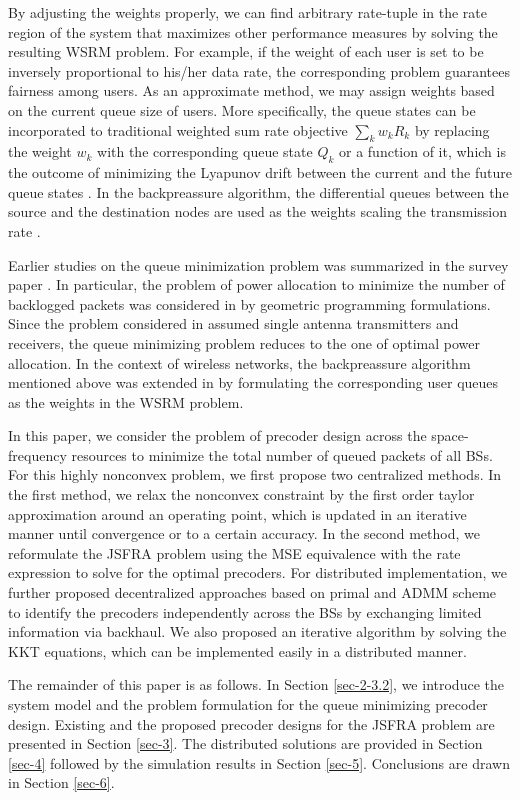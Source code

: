 By adjusting the weights properly, we can find arbitrary rate-tuple in the rate region of the system that maximizes other performance measures by solving the resulting WSRM problem. For example, if the weight of each user is set to be inversely proportional to his/her data rate, the corresponding problem guarantees fairness among users. As an approximate method, we may assign weights based on the current queue size of users. More specifically, the queue states can be incorporated to traditional weighted sum rate objective $\sum_k w_k R_k$ by replacing the weight $w_k$ with the corresponding queue state $Q_k$ or a function of it,  which is the outcome of minimizing the Lyapunov drift between the current and the future queue states \cite{tassiulas,neely2010stochastic}. In the backpreassure algorithm, the differential queues between the source and the destination nodes are used as the weights scaling the transmission rate \cite{georgiadis2006resource}.

Earlier studies on the queue minimization problem was summarized in the survey paper \cite{berry2004cross}. In particular, the problem of power allocation to minimize the number of backlogged packets was considered in \cite{qps_cioffi} by geometric programming formulations. Since the problem considered in \cite{qps_cioffi} assumed single antenna transmitters and receivers, the queue minimizing problem reduces to the one of optimal power allocation. In the context of wireless networks, the backpreassure algorithm mentioned above was extended in \cite{weeraddana2011resource} by formulating the corresponding user queues as the weights in the \ac{WSRM} problem.

In this paper, we consider the problem of precoder design across the space-frequency resources to minimize the total number of queued packets of all \acp{BS}. For this highly nonconvex problem, we first propose two centralized methods. In the first method, we relax the nonconvex constraint by the first order taylor approximation around an operating point, which is updated in an iterative manner until convergence or to a certain accuracy. In the second method, we reformulate the \ac{JSFRA} problem using the \ac{MSE} equivalence with the rate expression to solve for the optimal precoders. For distributed implementation, we further proposed decentralized approaches based on primal and \ac{ADMM} scheme to identify the precoders independently across the \acp{BS} by exchanging limited information via backhaul. We also proposed an iterative algorithm by solving the \ac{KKT} equations, which can be implemented easily in a distributed manner.

The remainder of this paper is as follows. In Section \ref{sec-2-3.2}, we introduce the system model and the problem formulation for the queue minimizing precoder design. Existing and the proposed precoder designs for the \ac{JSFRA} problem are presented in Section \ref{sec-3}. The distributed solutions are provided in Section \ref{sec-4} followed by the simulation results in Section \ref{sec-5}. Conclusions are drawn in Section \ref{sec-6}.